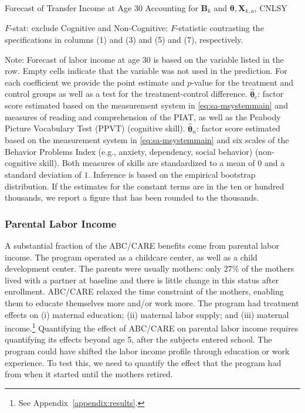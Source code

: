\begin{table}
\begin{threeparttable}
\caption{Forecast of Transfer Income at Age 30 Accounting for $\bm{B}_k$ and $\bm{\theta}, \bm{X}_{k,a}$, CNLSY} \label{table:trincome}
\centering
\footnotesize

\begin{tablenotes}
\footnotesize
\item $F$-stat: exclude Cognitive and Non-Cognitive: $F$-statistic contrasting the specifications in columns (1) and (3) and (5) and (7), respectively.\\
\item Note: Forecast of labor income at age 30 is based on the variable listed in the row. Empty cells indicate that the variable was not used in the prediction. For each coefficient we provide the point estimate and $p$-value for the treatment and control groups as well as a test for the treatment-control difference. $\hat{\bm{\theta}}_{c}$: factor score estimated based on the measurement system in \eqref{eq:sa-msystemmain} and measures of reading and comprehension of the PIAT, as well as the Peabody Picture Vocabulary Test (PPVT) (cognitive skill). $\hat{\bm{\theta}}_{n}$: factor score estimated based on the measurement system in \eqref{eq:sa-msystemmain} and six scales of the Behavior Problems Index (e.g., anxiety, dependency, social behavior) (non-cognitive skill).  Both measures of skills are standardized to a mean of $0$ and a standard deviation of $1$. Inference is based on the empirical bootstrap distribution. If the estimates for the constant terms are in the ten or hundred thousands, we report a figure that has been rounded to the thousands.
\end{tablenotes}
\end{threeparttable}
\end{table}

\subsubsection{Parental Labor Income}\label{app:parentalincome}

\noindent A substantial fraction of the ABC/CARE benefits come from parental labor income. The program operated as a childcare center, as well as a child development center. The parents were usually mothers: only $27\%$ of the mothers lived with a partner at baseline and there is little change in this status after enrollment. ABC/CARE relaxed the time constraint of the mothers, enabling them to educate themselves more and/or work more. The program had treatment effects on (i) maternal education; (ii) maternal labor supply; and (iii) maternal income.\footnote{See Appendix~\ref{appendix:results}.} Quantifying the effect of ABC/CARE on parental labor income requires quantifying its effects beyond age 5, after the subjects entered school. The program could have shifted the labor income profile through education or work experience. To test this, we need to quantify the effect that the program had from when it started until the mothers retired.

